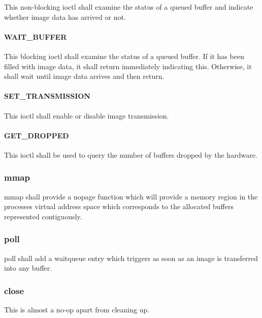 \documentclass[12pt]{article}
\begin{document}
This non-blocking ioctl shall examine the status of a queued buffer and indicate whether image data has arrived or not.

\paragraph{WAIT\_BUFFER}

This blocking ioctl shall examine the status of a queued buffer. If it has been filled with image data, it shall return immediately indicating this. Otherwise, it shall wait until image data arrives and then return.

\paragraph{SET\_TRANSMISSION}

This ioctl shall enable or disable image transmission.

\paragraph{GET\_DROPPED}

This ioctl shall be used to query the number of buffers dropped by the hardware.

\subsubsection{mmap}

mmap shall provide a nopage function which will provide a memory region in the processes virtual address space which corresponds to the allocated buffers represented contiguously.

\subsubsection{poll}

poll shall add a waitqueue entry which triggers as soon as an image is transferred into any buffer.

\subsubsection{close}

This is almost a no-op apart from cleaning up.
\end{document}
